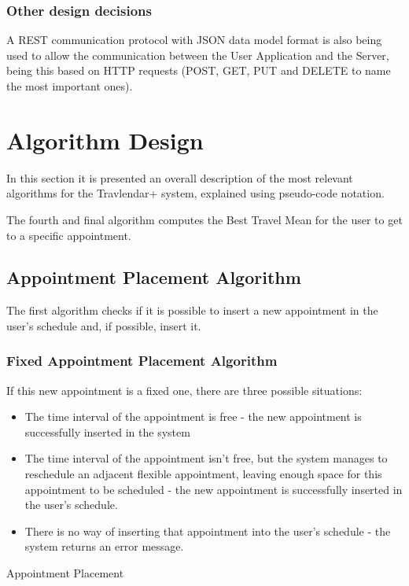 \documentclass[12pt]{article}
\begin{document}
\subsubsection{Other design decisions}
A REST communication protocol with JSON data model format is also being used to allow the communication between the User Application and the Server, being this based on HTTP requests (POST, GET, PUT and DELETE to name the most important ones).

\section{Algorithm Design}
In this section it is presented an overall description of the most relevant algorithms for the Travlendar+ system, explained using pseudo-code notation.

The fourth and final algorithm computes the Best Travel Mean for the user to get to a specific appointment.

\subsection{Appointment Placement Algorithm}
The first algorithm checks if it is possible to insert a new appointment in the user's schedule and, if possible, insert it.

\subsubsection{Fixed Appointment Placement Algorithm}

If this new appointment is a fixed one, there are three possible situations:
\begin{itemize}
    \item The time interval of the appointment is free - the new appointment is successfully inserted in the system
    \item The time interval of the appointment isn't free, but the system manages to reschedule an adjacent flexible appointment, leaving enough space for this appointment to be scheduled - the new appointment is successfully inserted in the user's schedule.
    \item There is no way of inserting that appointment into the user's schedule - the system returns an error message.
\end{itemize}

\begin{algorithm}[H]
\SetAlgoLined
{}
\caption{Appointment Placement}
\end{algorithm}
\end{document}

